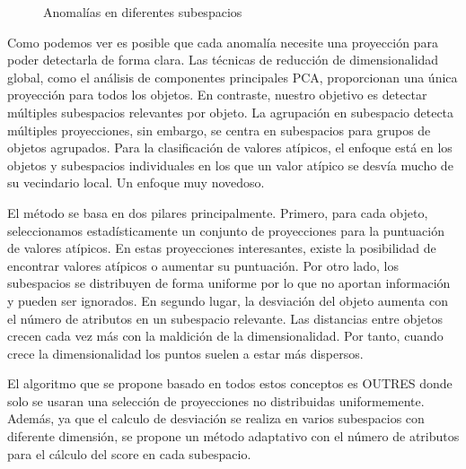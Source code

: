 \begin{figure}[h]
    \caption{\label{fig:subespacios} Anomalías en diferentes subespacios}
\end{figure}

Como podemos ver es posible que cada anomalía necesite una proyección para
poder detectarla de forma clara. Las técnicas de reducción de dimensionalidad 
global, como el análisis de componentes principales PCA, proporcionan 
una única proyección para todos los objetos. En contraste, nuestro objetivo es 
detectar múltiples subespacios relevantes por objeto. La agrupación en subespacio 
detecta múltiples proyecciones, sin embargo, se centra en subespacios para grupos 
de objetos agrupados. Para la clasificación de valores atípicos, el enfoque está 
en los objetos y subespacios individuales en los que un valor atípico se desvía 
mucho de su vecindario local. Un enfoque muy novedoso.


El método se basa en dos pilares principalmente. Primero, para cada objeto, 
seleccionamos estadísticamente un conjunto de proyecciones para la puntuación 
de valores atípicos. En estas proyecciones interesantes, existe la posibilidad
de encontrar valores atípicos o aumentar su puntuación. Por otro lado, los subespacios
se distribuyen de forma uniforme por lo que no aportan información y pueden ser
ignorados. En segundo lugar, la desviación del objeto aumenta con el número de
atributos en un subespacio relevante. Las distancias entre objetos crecen cada vez
más con la maldición de la dimensionalidad. Por tanto, cuando crece la dimensionalidad
los puntos suelen a estar más dispersos.


El algoritmo que se propone basado en todos estos conceptos es OUTRES donde solo se
usaran una selección de proyecciones no distribuidas uniformemente. Además, ya que el
calculo de desviación se realiza en varios subespacios con diferente dimensión, se propone
un método adaptativo con el número de atributos para el cálculo del score en cada subespacio.

